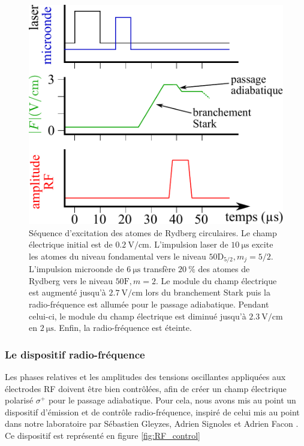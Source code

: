 \begin{figure}[!h]
\centering
\includegraphics[width=.7\linewidth]{figures/circulars/seq_circul}
\caption[Séquence d'excitation des atomes de Rydberg circulaires]{
Séquence d'excitation des atomes de Rydberg circulaires.
Le champ électrique initial est de $\SI{0.2}{\V/\cm}$.
L'impulsion laser de $\SI{10}{\us}$ excite les atomes du niveau fondamental vers le niveau $\mathrm{50D}_{5/2},m_j=5/2$.
L'impulsion microonde de $\SI{6}{\us}$ transfère $\SI{20}{\percent}$ des atomes de Rydberg vers le niveau $\mathrm{50F},m=2$.
Le module du champ électrique est augmenté jusqu'à $\SI{2.7}{\V/\cm}$ lors du \og branchement Stark \fg{} puis la radio-fréquence est allumée pour le passage adiabatique.
Pendant celui-ci, le module du champ électrique est diminué jusqu'à $\SI{2.3}{\V/\cm}$ en $\SI{2}{\us}$.
Enfin, la radio-fréquence est éteinte.
}
\label{fig:seq_circul}
\end{figure}

\clearpage
\subsubsection*{Le dispositif radio-fréquence}
\noindent %
Les phases relatives et les amplitudes des tensions oscillantes appliquées aux électrodes RF doivent être bien contrôlées, afin de créer un champ électrique polarisé $\sigma^+$ pour le passage adiabatique.
Pour cela, nous avons mis au point un dispositif d'émission et de contrôle radio-fréquence, inspiré de celui mis au point dans notre laboratoire par Sébastien Gleyzes, Adrien Signoles et Adrien Facon \cite{PHD_SIGNOLES,PHD_FACON}.
Ce dispositif est représenté en figure \eqref{fig:RF_control}

